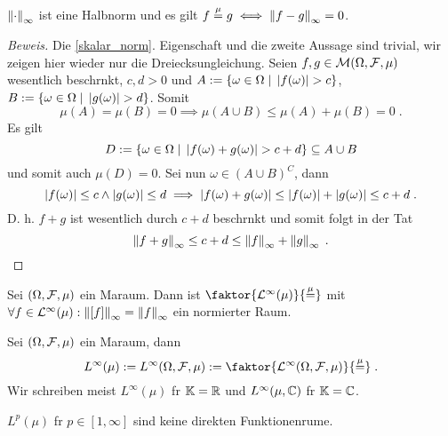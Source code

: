 \begin{theorem}
	\(\left\lVert\cdot\right\rVert_\infty\) ist eine Halbnorm und es gilt \(f\overset{\mu}{=} g \iff \left\lVert f-g\right\rVert_\infty = 0\).
\end{theorem}
\begin{proof}[Beweis]
	Die \ref{skalar_norm}. Eigenschaft und die zweite Aussage sind trivial, wir zeigen hier wieder nur die Dreiecksungleichung. Seien \(f,g \in \mathcal{M}(\Omega, \mathcal{F}, \mu)\) wesentlich beschr\as nkt, \(c,d > 0\) und \(A := \left\{\omega \in \Omega\;\vert\; \left\lvert f(\omega) \right\rvert > c\right\}\), \(B : = \left\{\omega\in\Omega\;\vert\;\left\lvert g(\omega) \right\rvert > d\right\}\). Somit 
	\[\mu(A) = \mu(B) = 0 \implies \mu(A\cup B) \leq \mu(A) + \mu(B) = 0\;.\]
	Es gilt 
	\[D: = \left\{\omega\in\Omega\;\vert\;\left\lvert f(\omega) + g(\omega) \right\rvert > c+d\right\} \subseteq A\cup B \]
	 und somit auch \(\mu(D) = 0\).
	Sei nun \(\omega \in (A\cup B)^C\), dann \[\left\lvert f(\omega) \right\rvert \leq c \land \left\lvert g(\omega) \right\rvert \leq d \implies \left\lvert f(\omega) + g(\omega) \right\rvert \leq \left\lvert f(\omega) \right\rvert + \left\lvert g(\omega) \right\rvert \leq c+d\;.\]
	D. h. \(f+g\) ist wesentlich durch \(c+d\) beschr\as nkt und somit folgt in der Tat
	\[\left\lVert f+g\right\rVert_\infty \leq c+d \leq \left\lVert f\right\rVert_\infty + \left\lVert g\right\rVert_\infty\;.\]
\end{proof}

\begin{theorem}
	Sei \((\Omega, \mathcal{F}, \mu)\) ein Ma\s raum. Dann ist \(\faktor{\p^\infty(\mu)}{\muq}\) mit \(\forall f \in \mathcal{L}^\infty(\mu): \left\lVert\left[ f\right]\right\rVert_\infty = \left\lVert f\right\rVert_\infty\) ein normierter Raum.
\end{theorem}

\begin{definition}
	Sei \((\Omega,\mathcal{F}, \mu)\) ein Ma\s raum, dann 
	\[L^\infty(\mu) := L^\infty(\Omega,\mc F, \mu) := \faktor{\p^\infty(\Omega, \mc F, \mu)}{\muq}\;.\]
	Wir schreiben meist \(L^\infty(\mu)\) f\us r \(\mathbb{K} = \mathbb{R}\) und \(L^\infty(\mu, \mathbb{C})\) f\us r \(\mathbb{K} = \mathbb{C}\).
\end{definition}

\begin{rem}
	\(L^p(\mu)\) f\us r \(p \in [1,\infty]\) sind keine direkten Funktionenr\as ume.
\end{rem}

